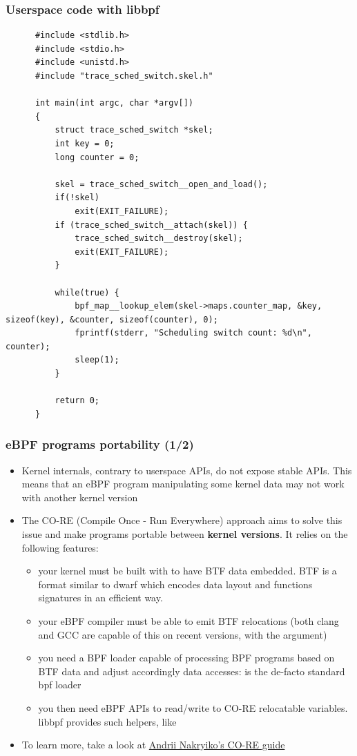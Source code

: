 \begin{frame}[fragile]
  \frametitle{Userspace code with libbpf}
  \begin{block}{}
    \begin{verbatim}
      #include <stdlib.h>
      #include <stdio.h>
      #include <unistd.h>
      #include "trace_sched_switch.skel.h"

      int main(int argc, char *argv[])
      {
          struct trace_sched_switch *skel;
          int key = 0;
          long counter = 0;

          skel = trace_sched_switch__open_and_load();
          if(!skel)
              exit(EXIT_FAILURE);
          if (trace_sched_switch__attach(skel)) {
              trace_sched_switch__destroy(skel);
              exit(EXIT_FAILURE);
          }

          while(true) {
              bpf_map__lookup_elem(skel->maps.counter_map, &key, sizeof(key), &counter, sizeof(counter), 0);
              fprintf(stderr, "Scheduling switch count: %d\n", counter);
              sleep(1);
          }

          return 0;
      }
    \end{verbatim}
  \end{block}
\end{frame}

\begin{frame}
  \frametitle{eBPF programs portability (1/2)}
  \begin{itemize}
    \item Kernel internals, contrary to userspace APIs, do not expose stable APIs.
    This means that an eBPF program manipulating some kernel data may not work
    with another kernel version
    \item The CO-RE (Compile Once - Run Everywhere) approach aims to solve this issue
    and make programs portable between \textbf{kernel versions}. It relies on
    the following features:
    \begin{itemize}
      \item your kernel must be built with
       to have BTF data embedded. BTF is a
      format similar to dwarf which encodes data layout and functions
      signatures in an efficient way.
      \item your eBPF compiler must be able to emit BTF relocations (both clang
      and GCC are capable of this on recent versions, with the  argument)
      \item you need a BPF loader capable of processing BPF programs based on BTF data and
      adjust accordingly data accesses:  is the de-facto standard bpf
      loader
      \item you then need eBPF APIs to read/write to CO-RE relocatable
      variables. libbpf provides such helpers, like 
    \end{itemize}
    \item To learn more, take a look at
    \href{https://nakryiko.com/posts/bpf-core-reference-guide/}{Andrii
    Nakryiko's CO-RE guide}
  \end{itemize}
\end{frame}

